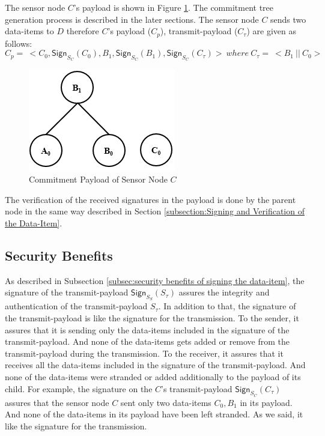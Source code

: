 	The sensor node $C$'s payload is shown in Figure \ref{fig:Commitment payload of C}.
	The commitment tree generation process is described in the later sections. 
	The sensor node $C$ sends two data-items to $D$ therefore $C$'s payload ($C_{p}$), transmit-payload ($C_{\tau}$) are given as follows:
	\begin{equation}
		 	C_{p} =\ <C_{0}, \textsf{Sign}_{S_{C}}(C_{0}), B_{1}, \textsf{Sign}_{S_{C}}(B_{1}), \textsf{Sign}_{S_{C}}(C_{\tau}) >\ where\ C_{\tau} =\ <B_{1}\ ||\ C_{0}>
	\end{equation}
	\begin{figure}[h!]
		\centering
		\includegraphics[scale = 1]{images/commitment-payload-of-C.png}
		\caption{Commitment Payload of Sensor Node $C$}
		\label{fig:Commitment payload of C}
	\end{figure}
	The verification of the received signatures in the payload is done by the parent node in the same way described in Section \ref{subsection:Signing and Verification of the Data-Item}.

	\subsection{Security Benefits}
		As described in Subsection \ref{subsec:security benefits of signing the data-item}, the signature of the transmit-payload $\textsf{Sign}_{S_{S}}(S_{\tau})$ assures the integrity and authentication of the transmit-payload $S_{\tau}$.
		In addition to that, the signature of the transmit-payload is like the signature for the transmission.
		To the sender, it assures that it is sending only the data-items included in the signature of the transmit-payload.
		And none of the data-items gets added or remove from the transmit-payload during the transmission. 
		To the receiver, it assures that it receives all the data-items included in the signature of the transmit-payload. 
		And none of the data-items were stranded or added additionally to the payload of its child.
		For example, the signature on the $C$'s transmit-payload $\textsf{Sign}_{S_{C}}(C_{\tau})$ assures that the sensor node $C$ sent only two data-items $C_{0},B_{1}$ in its payload.
		And none of the data-items in its payload have been left stranded.
		As we said, it like the signature for the transmission.

